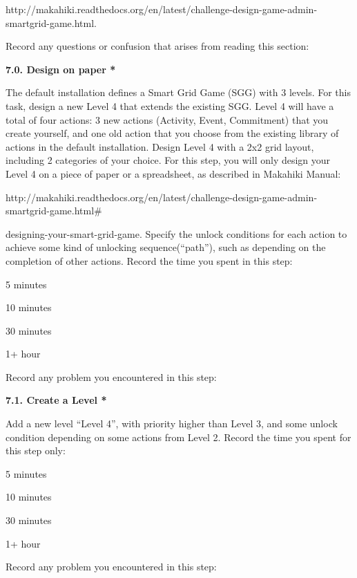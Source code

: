 http://makahiki.readthedocs.org/en/latest/challenge-design-game-admin-smartgrid-game.html. 

Record any questions or confusion that arises from reading this section: \underline{\hspace{3cm}}

{\bf 7.0. Design on paper *}

The default installation defines a Smart Grid Game (SGG) with 3 levels. For this task, design a new Level 4 that extends the existing SGG. Level 4 will have a total of four actions: 3 new actions (Activity, Event, Commitment) that you create yourself, and one old action that you choose from the existing library of actions in the default installation. Design Level 4 with a 2x2 grid layout, including 2 categories of your choice. For this step, you will only design your Level 4 on a piece of paper or a spreadsheet, as described in Makahiki Manual:

http://makahiki.readthedocs.org/en/latest/challenge-design-game-admin-smartgrid-game.html\#

designing-your-smart-grid-game. Specify the unlock conditions for each action to achieve some kind of unlocking sequence(``path''), such as depending on the completion of other actions. Record the time you spent in this step:

\begin{radiobutton}
\item 5 minutes
\item  10 minutes
\item  30 minutes
\item  1+ hour
\end{radiobutton}


Record any problem you encountered in this step: \underline{\hspace{4cm}}

{\bf 7.1. Create a Level *}

Add a new level ``Level 4'', with priority higher than Level 3, and some unlock condition depending on some actions from Level 2. Record the time you spent for this step only:

\begin{radiobutton}
\item 5 minutes
\item  10 minutes
\item  30 minutes
\item  1+ hour
\end{radiobutton}


Record any problem you encountered in this step: \underline{\hspace{4cm}}

